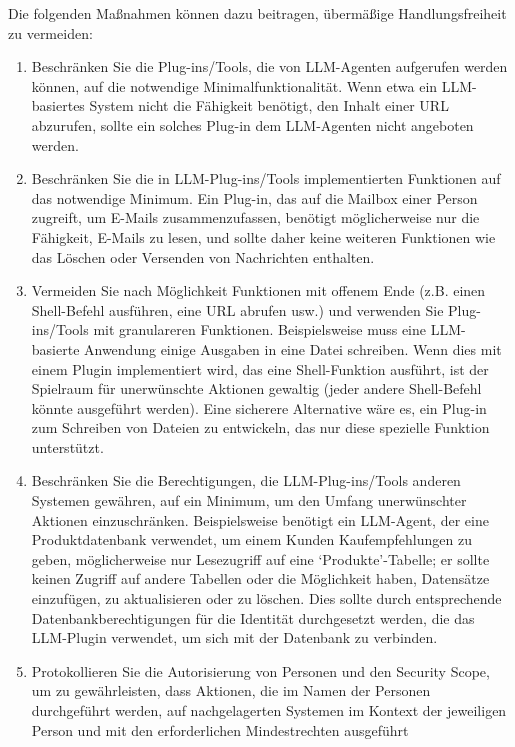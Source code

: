 \documentclass[
]{article}
\providecommand{\tightlist}{%
  \setlength{\itemsep}{0pt}\setlength{\parskip}{0pt}}
\begin{document}
Die folgenden Maßnahmen können dazu beitragen, übermäßige
Handlungsfreiheit zu vermeiden:

\begin{enumerate}
\def\labelenumi{\arabic{enumi}.}
\tightlist
\item
  Beschränken Sie die Plug-ins/Tools, die von LLM-Agenten aufgerufen
  werden können, auf die notwendige Minimalfunktionalität. Wenn etwa ein
  LLM-basiertes System nicht die Fähigkeit benötigt, den Inhalt einer
  URL abzurufen, sollte ein solches Plug-in dem LLM-Agenten nicht
  angeboten werden.
\item
  Beschränken Sie die in LLM-Plug-ins/Tools implementierten Funktionen
  auf das notwendige Minimum. Ein Plug-in, das auf die Mailbox einer
  Person zugreift, um E-Mails zusammenzufassen, benötigt möglicherweise
  nur die Fähigkeit, E-Mails zu lesen, und sollte daher keine weiteren
  Funktionen wie das Löschen oder Versenden von Nachrichten enthalten.
\item
  Vermeiden Sie nach Möglichkeit Funktionen mit offenem Ende (z.B. einen
  Shell-Befehl ausführen, eine URL abrufen usw.) und verwenden Sie
  Plug-ins/Tools mit granulareren Funktionen. Beispielsweise muss eine
  LLM-basierte Anwendung einige Ausgaben in eine Datei schreiben. Wenn
  dies mit einem Plugin implementiert wird, das eine Shell-Funktion
  ausführt, ist der Spielraum für unerwünschte Aktionen gewaltig (jeder
  andere Shell-Befehl könnte ausgeführt werden). Eine sicherere
  Alternative wäre es, ein Plug-in zum Schreiben von Dateien zu
  entwickeln, das nur diese spezielle Funktion unterstützt.
\item
  Beschränken Sie die Berechtigungen, die LLM-Plug-ins/Tools anderen
  Systemen gewähren, auf ein Minimum, um den Umfang unerwünschter
  Aktionen einzuschränken. Beispielsweise benötigt ein LLM-Agent, der
  eine Produktdatenbank verwendet, um einem Kunden Kaufempfehlungen zu
  geben, möglicherweise nur Lesezugriff auf eine `Produkte'-Tabelle; er
  sollte keinen Zugriff auf andere Tabellen oder die Möglichkeit haben,
  Datensätze einzufügen, zu aktualisieren oder zu löschen. Dies sollte
  durch entsprechende Datenbankberechtigungen für die Identität
  durchgesetzt werden, die das LLM-Plugin verwendet, um sich mit der
  Datenbank zu verbinden.
\item
  Protokollieren Sie die Autorisierung von Personen und den Security
  Scope, um zu gewährleisten, dass Aktionen, die im Namen der Personen
  durchgeführt werden, auf nachgelagerten Systemen im Kontext der
  jeweiligen Person und mit den erforderlichen Mindestrechten ausgeführt

\end{enumerate}
\end{document}
